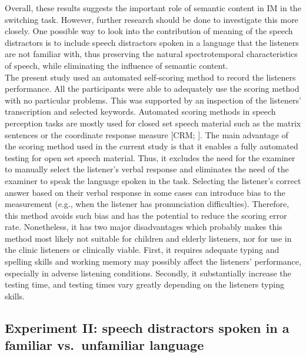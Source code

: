 \documentclass[a4paper, twoside]{templates/ociamthesis}
\begin{document}
Overall, these results suggests the important role of semantic content in IM in the switching task. However, further research should be done to investigate this more closely. One possible way to look into the contribution of meaning of the speech distractors is to include speech distractors spoken in a language that the listeners are not familiar with, thus preserving the natural spectrotemporal characteristics of speech, while eliminating the influence of semantic content.\\

The present study used an automated self-scoring method to record the listeners performance. All the participants were able to adequately use the scoring method with no particular problems. This was supported by an inspection of the listeners' transcription and selected keywords. Automated scoring methods in speech perception tasks are mostly used for closed set speech material such as the matrix sentences \autocite{Kollmeier2015} or the coordinate response measure {[}CRM; \textcite{Bolia2000}{]}. The main advantage of the scoring method used in the current study is that it enables a fully automated testing for open set speech material. Thus, it excludes the need for the examiner to manually select the listener's verbal response and eliminates the need of the examiner to speak the language spoken in the task. Selecting the listener's correct answer based on their verbal response in some cases can introduce bias to the measurement (e.g., when the listener has pronunciation difficulties). Therefore, this method avoids such bias and has the potential to reduce the scoring error rate. Nonetheless, it has two major disadvantages which probably makes this method most likely not suitable for children and elderly listeners, nor for use in the clinic listeners or clinically viable. First, it requires adequate typing and spelling skills and working memory may possibly affect the listeners' performance, especially in adverse listening conditions. Secondly, it substantially increase the testing time, and testing times vary greatly depending on the listeners typing skills.\\

\hypertarget{experiment-ii-speech-distractors-spoken-in-a-familiar-vs.-unfamiliar-language}{%
\subsection{Experiment II: speech distractors spoken in a familiar vs.~unfamiliar language}\label{experiment-ii-speech-distractors-spoken-in-a-familiar-vs.-unfamiliar-language}}
\end{document}
